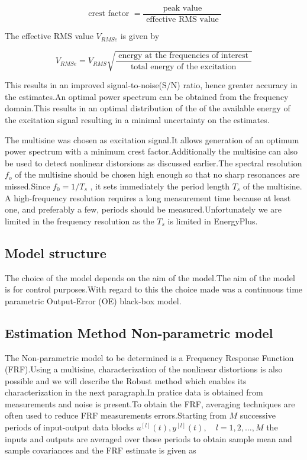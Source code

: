 \documentclass[a4paper,12pt]{report}
\numberwithin{equation}{section}
\begin{document}
$$
\text { crest factor }=\frac{\text { peak value }}{\text { effective RMS value }}
$$

The effective RMS value $V_{RMSe}$ is given by

$$
V_{R M S e}=V_{R M S} \sqrt{\frac{\text { energy at the frequencies of interest }}{\text { total energy of the excitation }}}
$$

\noindent
This results in an improved signal-to-noise(S/N) ratio, hence greater accuracy in the estimates.An optimal power spectrum can be obtained from the frequency domain.This results in an optimal distribution of the of the available energy of the excitation signal resulting in a minimal uncertainty on the estimates.

The multisine was chosen as excitation signal.It allows generation of an optimum power spectrum with a minimum crest factor.Additionally the multisine can also be used to detect nonlinear distorsions as discussed earlier.The spectral resolution $f_{o}$ of the multisine should be chosen high enough so that no sharp resonances are missed.Since $f_{0}=1 / T_{s}$ , it sets immediately the period length $T_{s}$ of the multisine. A high-frequency resolution requires a long measurement time because at least one, and preferably a few, periods should be measured.Unfortunately we are limited in the frequency resolution as the $T_{s}$ is limited in EnergyPlus.

\subsection{ Model structure }
The choice of the model depends on the aim of the model.The aim of the model is for control purposes.With regard to this the choice made was a continuous time parametric Output-Error (OE) black-box model.

\subsection{Estimation Method Non-parametric model}
The Non-parametric model to be determined is a Frequency Response Function (FRF).Using a multisine,  characterization of the nonlinear distortions is also possible and we will describe the Robust method which enables its characterization in the next paragraph.In pratice data is obtained from measurements and noise is present.To obtain the FRF, averaging techniques are often used to reduce FRF measurements errors.Starting from $M$ successive periods of  input-output data blocks $u^{[l]}(t), y^{[l]}(t), \quad l=1,2, \ldots, M$ the inputs and outputs are averaged over those periods to obtain sample mean and sample covariances and the FRF estimate is given as
\end{document}

